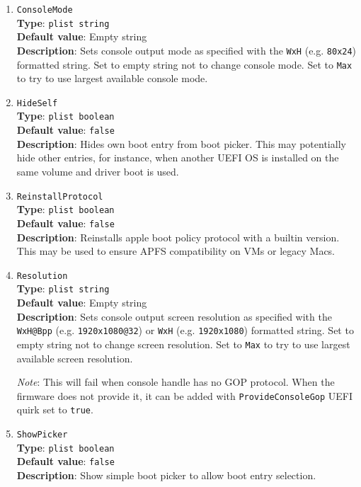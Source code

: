 \documentclass[]{article}
\begin{document}
\begin{enumerate}

\item
  \texttt{ConsoleMode}\\
  \textbf{Type}: \texttt{plist\ string}\\
  \textbf{Default value}: Empty string\\
  \textbf{Description}: Sets console output mode as specified
  with the \texttt{WxH} (e.g. \texttt{80x24}) formatted string.
  Set to empty string not to change console mode. Set to \texttt{Max}
  to try to use largest available console mode.

\item
  \texttt{HideSelf}\\
  \textbf{Type}: \texttt{plist\ boolean}\\
  \textbf{Default value}: \texttt{false}\\
  \textbf{Description}: Hides own boot entry from boot picker. This
  may potentially hide other entries, for instance, when another UEFI OS is
  installed on the same volume and driver boot is used.

\item
  \texttt{ReinstallProtocol}\\
  \textbf{Type}: \texttt{plist\ boolean}\\
  \textbf{Default value}: \texttt{false}\\
  \textbf{Description}: Reinstalls apple boot policy protocol with a builtin
  version. This may be used to ensure APFS compatibility on VMs or legacy Macs.

\item
  \texttt{Resolution}\\
  \textbf{Type}: \texttt{plist\ string}\\
  \textbf{Default value}: Empty string\\
  \textbf{Description}: Sets console output screen resolution as specified
  with the \texttt{WxH@Bpp} (e.g. \texttt{1920x1080@32}) or
  \texttt{WxH} (e.g. \texttt{1920x1080}) formatted string. Set to empty string
  not to change screen resolution. Set to \texttt{Max} to try to use largest
  available screen resolution.

  \emph{Note}: This will fail when console handle has no GOP protocol. When
  the firmware does not provide it, it can be added with \texttt{ProvideConsoleGop}
  UEFI quirk set to \texttt{true}.

\item
  \texttt{ShowPicker}\\
  \textbf{Type}: \texttt{plist\ boolean}\\
  \textbf{Default value}: \texttt{false}\\
  \textbf{Description}: Show simple boot picker to allow boot entry selection.


\end{enumerate}
\end{document}
